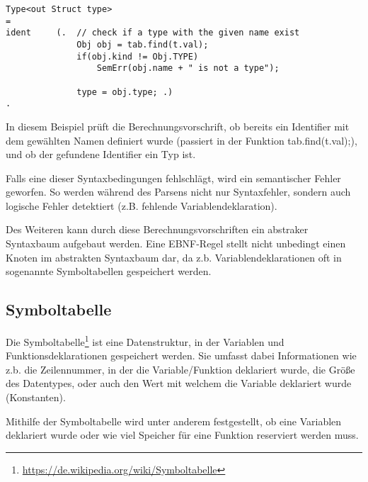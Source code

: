 
\begin{lstlisting}[language=EBNF]
Type<out Struct type>
= 
ident     (.  // check if a type with the given name exist
              Obj obj = tab.find(t.val);
              if(obj.kind != Obj.TYPE)
                  SemErr(obj.name + " is not a type");

              type = obj.type; .)
. 
\end{lstlisting}

In diesem Beispiel pr\"uft die Berechnungsvorschrift, ob bereits ein Identifier mit dem gew\"ahlten Namen definiert wurde (passiert in der Funktion tab.find(t.val);), und ob der gefundene Identifier ein Typ ist. 

Falls eine dieser Syntaxbedingungen fehlschl\"agt, wird ein semantischer Fehler geworfen. So werden w\"ahrend des Parsens nicht nur Syntaxfehler, sondern auch logische Fehler detektiert (z.B. fehlende Variablendeklaration).

Des Weiteren kann durch diese Berechnungsvorschriften ein abstraker Syntaxbaum aufgebaut werden. Eine EBNF-Regel stellt nicht unbedingt einen Knoten im abstrakten Syntaxbaum dar, da z.b. Variablendeklarationen oft in sogenannte Symboltabellen gespeichert werden.

\subsection{Symboltabelle}

Die Symboltabelle\footnote{\url{https://de.wikipedia.org/wiki/Symboltabelle}} ist eine Datenstruktur, in der Variablen und Funktionsdeklarationen gespeichert werden. Sie umfasst dabei Informationen wie z.b. die Zeilennummer, in der die Variable/Funktion deklariert wurde, die Gr\"o\ss{}e des Datentypes, oder auch den Wert mit welchem die Variable deklariert wurde (Konstanten).

Mithilfe der Symboltabelle wird unter anderem festgestellt, ob eine Variablen deklariert wurde oder wie viel Speicher f\"ur eine Funktion reserviert werden muss.



